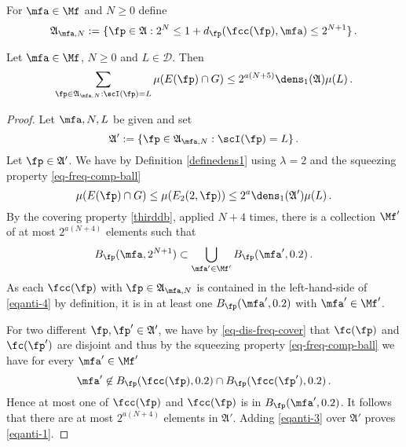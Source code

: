 For $\mfa \in \Mf$ and $N\ge 0$ define
\begin{equation}\label{eqantidefap}
    \mathfrak{A}_{\mfa,N}:=\{\fp\in\mathfrak{A}: 2^{N}\le 1+d_{\fp}(\fcc(\fp), \mfa)\le 2^{N+1}\} \, .
\end{equation}


\begin{lemma}
\label{stack-density}
Let $\mfa \in \Mf$, $N\ge 0$ and
$L\in \mathcal{D}$. Then
\begin{equation}\label{eqanti-1}
    \sum_{\fp\in\mathfrak{A}_{\mfa,N}:\scI(\fp)=L}\mu(E(\fp)\cap G)\le 2^{a(N+5)}\dens_1(\mathfrak{A})\mu(L)\, .
\end{equation}
\end{lemma}
\begin{proof}
Let $\mfa,N,L$ be given and set
\begin{equation}
\mathfrak{A}':=\{\fp\in\mathfrak{A}_{\mfa,N}:\scI(\fp)=L\}\, .
\end{equation}
Let
$\fp\in\mathfrak{A}'$.
We have
by Definition \eqref{definedens1}
using $\lambda=2$ and the squeezing property \eqref{eq-freq-comp-ball}
\begin{equation}\label{eqanti-3}
\mu(E(\fp)\cap G)\le \mu(E_2(2, \fp))\le 2^{a}\dens_1(\mathfrak{A}')\mu(L)\, .
\end{equation}
By the covering property \eqref{thirddb}, applied $N+4$ times, there is a collection $\Mf'$ of at most $2^{a(N+4)}$
elements such that
\begin{equation}\label{eqanti-4}
    B_{\fp}(\mfa, 2^{N+1})\subset \bigcup_{\mfa'\in \Mf'}
    B_{\fp}(\mfa', 0.2)\, .
\end{equation}
As each $\fcc(\fp)$ with $\fp\in \mathfrak{A}_{\mfa,N}$
is contained in the left-hand-side
of \eqref{eqanti-4}
by definition, it is in at least one $B_{\fp}(\mfa', 0.2)$
with $\mfa'\in \Mf'$.


For two different $\fp,\fp'\in \mathfrak{A}'$, we have by
\eqref{eq-dis-freq-cover} that
$\fc(\fp)$ and $\fc(\fp')$ are disjoint and thus by the squeezing property \eqref{eq-freq-comp-ball} we have for every $\mfa'\in \Mf'$
\begin{equation}
    \mfa'\not\in B_{\fp}(\fcc(\fp), 0.2)\cap
B_{\fp}(\fcc(\fp'), 0.2)\, .
\end{equation}
Hence at most one of $\fcc(\fp)$
and $\fcc(\fp)$ is in
$B_{\fp}(\mfa', 0.2)$.
It follows that there are at most $2^{a(N+4)}$ elements in
$\mathfrak{A}'$. Adding \eqref{eqanti-3} over $\mathfrak{A}'$ proves
\eqref{eqanti-1}.
\end{proof}


